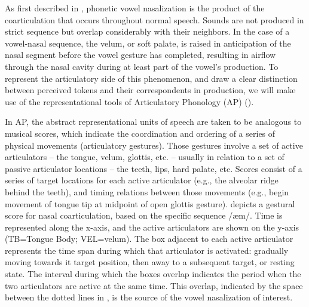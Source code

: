 As first described in ,
phonetic vowel nasalization is the product of the coarticulation that
occurs throughout normal speech. Sounds are not produced in strict
sequence but overlap considerably with their neighbors. In the case
of a vowel-nasal sequence, the velum, or soft palate, is raised in
anticipation of the nasal segment before the vowel gesture has completed,
resulting in airflow through the nasal cavity during at least part
of the vowel's production. To represent the articulatory side of this
phenomenon, and draw a clear distinction between perceived tokens
and their correspondents in production, we will make use of the representational
tools of Articulatory Phonology (AP) (\citealt{Browman1986,Browman1990}). 

In AP, the abstract representational units of speech are taken to
be analogous to musical scores, which indicate the coordination and
ordering of a series of physical movements (articulatory gestures).
Those gestures involve a set of active articulators – the tongue,
velum, glottis, etc. – usually in relation to a set of passive articulator
locations – the teeth, lips, hard palate, etc. Scores consist of a
series of target locations for each active articulator (e.g., the
alveolar ridge behind the teeth), and timing relations between those
movements (e.g., begin movement of tongue tip at midpoint of open
glottis gesture).  depicts a gestural
score for nasal coarticulation, based on the specific sequence {/æm/}.
Time is represented along the x-axis, and the active articulators
are shown on the y-axis (TB=Tongue Body; VEL=velum). The box adjacent
to each active articulator represents the time span during which that
articulator is activated: gradually moving towards it target position,
then away to a subsequent target, or resting state. The interval during
which the boxes overlap indicates the period when the two articulators
are active at the same time. This overlap, indicated by the space
between the dotted lines in , is
the source of the vowel nasalization of interest. 

